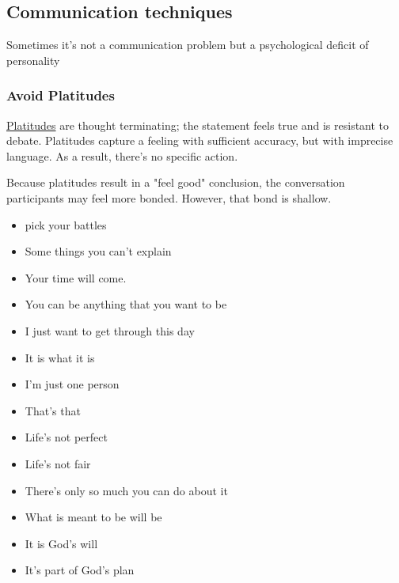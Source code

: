 \subsection{Communication techniques}

Sometimes it's not a communication problem but a psychological deficit of personality


\subsubsection{Avoid Platitudes}
\href{https://en.wikipedia.org/wiki/Platitude}{Platitudes} are \gls{thought terminating}; the statement feels true and is resistant to debate. Platitudes capture a feeling with sufficient accuracy, but with imprecise language. As a result, there's no specific action.

Because platitudes result in a "feel good" conclusion, the conversation participants may feel more bonded. However, that bond is shallow.

\begin{itemize}
    \item pick your battles
    \item Some things you can't explain
    \item Your time will come.
    \item You can be anything that you want to be
    \item I just want to get through this day
    \item It is what it is
    \item I'm just one person
    \item That's that
    \item Life's not perfect
    \item Life's not fair
    \item There's only so much you can do about it
    \item What is meant to be will be
    \item It is God's will
    \item It's part of God's plan
\end{itemize}

